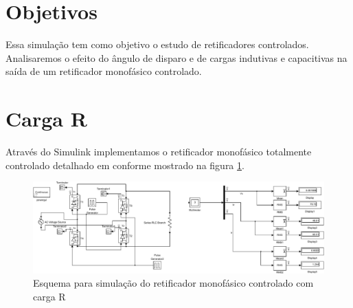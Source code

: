 \documentclass{report}
\begin{document}


\onehalfspacing
\section{Objetivos}
	Essa simulação tem como objetivo o estudo de retificadores controlados. Analisaremos o efeito do ângulo de disparo e de cargas indutivas e capacitivas na saída de um retificador monofásico controlado.
	 
\section{Carga R}
Através do Simulink implementamos o retificador monofásico totalmente controlado detalhado em \cite{bb:rsim2} conforme mostrado na figura \ref{fig:rsim}.
\begin{figure}[H]
	\centering
	\includegraphics[width=\linewidth]{matlab/rsim}
	\caption{Esquema para simulação do retificador monofásico controlado com carga R}
	\label{fig:rsim}
\end{figure}
\end{document}
